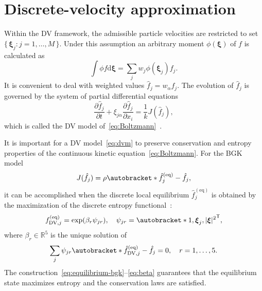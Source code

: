 \documentclass{elsarticle} %
\newcommand{\dd}{\mathrm{d}}
\newcommand{\pder}[2][]{\frac{\partial#1}{\partial#2}}
\newcommand{\Set}[2]{\{\,{#1}:{#2}\,\}}
\newcommand{\transpose}[1]{#1^\mathsf{T}}
\DeclarePairedDelimiter\autobracket()       %
\newcommand{\br}[1]{\autobracket*{#1}}
\newcommand{\dxi}{\dd{\boldsymbol{\xi}}}
\newcommand{\bxi}{\boldsymbol{\xi}}
\newcommand{\equil}[1]{#1^\mathrm{(eq)}}
\newcommand{\DV}{\mathrm{DV}}
\newcommand{\xiai}{\xi_{j \alpha}}
\begin{document}
\section{Discrete-velocity approximation}\label{sec:dv}

Within the DV framework, the admissible particle velocities are restricted to set \(\Set{\bxi_j}{j=1,\dots,M}\).
Under this assumption an arbitrary moment \(\phi(\bxi)\) of \(f\) is calculated as
\begin{equation}\label{eq:cubature}
    \int \phi f\dxi = \sum_j w_j \phi(\bxi_j) f_j.
\end{equation}
It is convenient to deal with weighted values \(\hat{f}_j = w_\alpha f_j\).
The evolution of \(\hat{f}_j\) is governed by the system of partial differential equations
\begin{equation}\label{eq:dvm}
    \pder[\hat{f}_j]{t} + \xiai\pder[\hat{f}_j]{x_i} = \frac1kJ(\hat{f}_j),
\end{equation}
which is called the DV model of~\eqref{eq:Boltzmann}~\cite{Cabannes1980}.

It is important for a DV model~\eqref{eq:dvm} to preserve conservation and entropy properties
of the continuous kinetic equation~\eqref{eq:Boltzmann}.
For the BGK model
\begin{equation}\label{eq:dvm-bgk}
    J(\hat{f}_j) = \rho\br{\equil{\hat{f}}_j-\hat{f}_j},
\end{equation}
it can be accomplished when the discrete local equilibrium \(\equil{\hat{f}}_j\)
is obtained by the maximization of the discrete entropy functional~\cite{Mieussens2000}:
\begin{equation}\label{eq:equilibrium-bgk}
    \equil{f}_{\DV,j} = \exp(\beta_r\psi_{jr}), \quad \psi_{jr} = \transpose{\br{1,\bxi_j,|\bxi|^2}},
\end{equation}
where \(\beta_r\in\mathbb{R}^5\) is the unique solution of
\begin{equation}\label{eq:beta}
    \sum_j\psi_{jr}\br{\equil{\hat{f}}_{\DV,j} - \hat{f}_j} = 0, \quad r = 1,\dots,5.
\end{equation}
The construction~\eqref{eq:equilibrium-bgk}--\eqref{eq:beta} guarantees that
the equilibrium state maximizes entropy and the conservation laws are satisfied.

\end{document}
